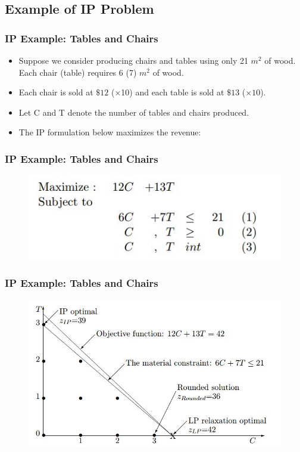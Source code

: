 \documentclass{beamer}
\begin{document}
\subsection{Example of IP Problem}
\begin{frame}
\frametitle{IP Example:  Tables and Chairs}
\begin{itemize}
	\item Suppose we consider producing chairs and tables using only 21 $m^2$ of
	wood. Each chair (table) requires 6 (7) $m^2$ of wood. 
	\item Each chair is sold at $\$12$ (×10) and each table is sold
	at $\$13$ ($\times 10$). 
	\item Let C and T denote the number of tables and chairs produced. 
	\item The IP formulation below
	maximizes the revenue:
\end{itemize}
\end{frame}
\begin{frame}
\frametitle{IP Example:  Tables and Chairs}
\begin{figure}
\centering
\includegraphics[width=0.7\linewidth]{IPintro1}
\end{figure}

\end{frame}
\begin{frame}
\frametitle{IP Example:  Tables and Chairs}
\begin{figure}
\centering
\includegraphics[width=0.7\linewidth]{IPintro2}

\end{figure}
\end{frame}
\end{document}
